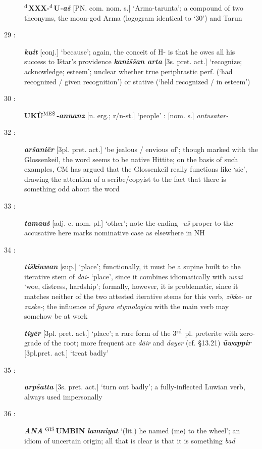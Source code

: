 \documentclass[10pt]{article}
\newcommand{\supersc}[1]{$^{\textrm{\scriptsize{#1}}}$}  	%
\newcommand{\bit}[1]{\textbf{\textit{#1}}}				%
\newcommand{\p}[1]{{\tiny[{#1}]}}					%
\newcommand{\hith}{\textsubwedge{h}}
\newcommand{\mpl}{\supersc{ME\v{S}}}
\newcommand{\wood}{\supersc{GI\v{S}}}
\renewcommand{\.}[1]{\textsubdot{#1}}
\begin{document}
\begin{description}
\textbf{\supersc{d}XXX-\supersc{d}U}\bit{-a\v{s}} \p{PN. com. nom. s.} `Arma-tar{\hith}unta'; a compound  of two theonyms, the moon-god Arma (logogram identical to `30') and Tar{\hith}un

\item[29 :] \bit{kuit} \p{conj.} `because'; again, the conceit of H- is that he owes all his success to I\v{s}tar's providence \bit{kani\v{s}\v{s}an {\hith}arta} \p{3s. pret. act.} `recognize; acknowledge; esteem'; unclear whether true periphrastic perf. (`had recognized / given recognition') or stative (`held recognized / in esteem')

\item[30 :] \textbf{UK\`U{\mpl}}\bit{-annanz} \p{n. erg.; r/n-st.} `people' : \p{nom. s.} \textit{antu{\hith}satar-}

\item[32 :] \bit{ar\v{s}ani\=er} \p{3pl. pret. act.} `be jealous / envious of'; though marked with the Glossenkeil, the word seems to be native Hittite; on the basis of such examples, CM has argued that the Glossenkeil really functions like `sic', drawing the attention of a scribe/copyist to the fact that there is something odd about the word

\item[33 :] \bit{tam\=au\v{s}} \p{adj. c. nom. pl.} `other'; note the ending \textit{-u\v{s}} proper to the accusative here marks nominative case as elsewhere in NH

\item[34 :] \bit{ti\v{s}kiuwan} \p{sup.} `place'; functionally, it must be a supine built to the iterative stem of \textit{dai-} `place', since it combines idiomatically with \textit{uwai} `woe, distress, hardship'; formally, however, it is problematic, since it matches neither of the two attested iterative stems for this verb, \textit{zikke-} or \textit{zaske-}; the influence of \textit{figura etymologica} with the main verb may somehow be at work 

\bit{tiy\=er} \p{3pl. pret. act.} `place'; a rare form of the 3\supersc{rd} pl. preterite with zero-grade of the root; more frequent are \textit{d\=air} and \textit{dayer} (cf.  \S13.21) \bit{{\hith}\=uwappir} \p{3pl.pret. act.} `treat badly'

\item[35 :] \bit{arp\v{s}atta} \p{3s. pret. act.} `turn out badly'; a fully-inflected Luwian verb, always used impersonally

\item[36 :] \bit{ANA} \textbf{{\wood}UMBIN} \bit{lamniyat} `(lit.) he named (me) to the wheel'; an idiom of uncertain origin; all that is clear is that it is something \textit{bad} 


\end{description}
\end{document}
